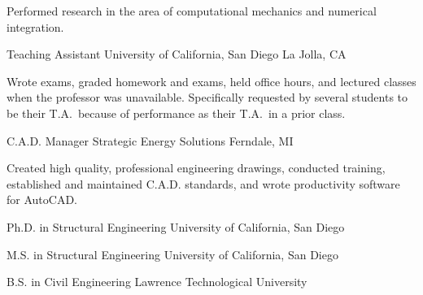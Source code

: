 \documentclass{resume}
\begin{document}
					\vspace*{-6pt}
					\noindent Performed research in the area of computational mechanics and numerical integration.\hspace*{0pt}\\ \vspace*{-2pt}
				
            {Teaching Assistant}
            {University of California, San Diego}
			{La Jolla, CA}
			
					\vspace*{-6pt}
					\noindent 
				Wrote exams, graded homework and exams, held office hours, and lectured classes when the professor
				was unavailable.  Specifically requested by several students to be their T.A.\ because of 
				performance as their T.A.\ in a prior class.
			\hspace*{0pt}\\ \vspace*{-2pt}
				
            {C.A.D. Manager}
            {Strategic Energy Solutions}
			{Ferndale, MI}
			
					\vspace*{-6pt}
					\noindent 
				Created high quality, professional engineering drawings, conducted training, established 
				and maintained C.A.D. standards, and wrote productivity software for AutoCAD.
			\hspace*{0pt}\\ \vspace*{-2pt}
				
		\vspace*{-8pt}
	

	
                {Ph.D. in Structural Engineering}
                {University of California, San Diego}
		
                {M.S. in Structural Engineering}
                {University of California, San Diego}
		
                {B.S. in Civil Engineering}
                {Lawrence Technological University}
		

    \vspace*{1pt}
    
    
\end{document}
